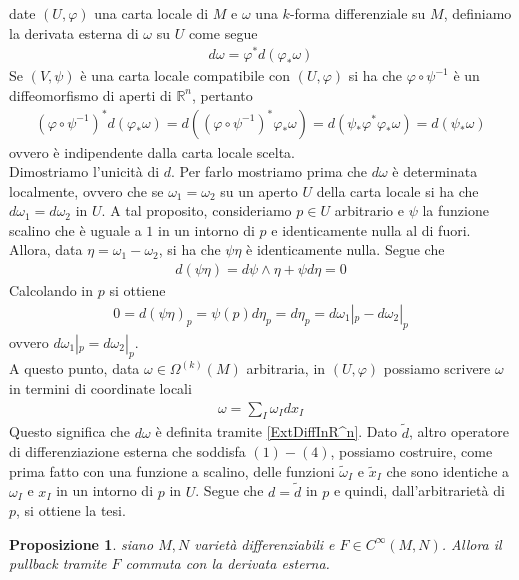 \documentclass[twoside, 11pt]{amsbook}
\makeatletter
\newcommand{\0}{{(0)}}
\newcommand{\3}{{(3)}}
\theoremstyle{colonplain}
\newtheorem{prop}[thm]{Proposizione}
\theoremstyle{colondefinition}
\theoremstyle{colonremark}
\numberwithin{equation}{chapter}
\renewcommand{\proofname}{Dimostrazione}
\renewenvironment{proof}[1][\proofname]{\par
  \pushQED{\qed}%
  \normalfont \topsep6\p@\@plus6\p@\relax
  \trivlist
  \item[\hskip\labelsep\bfseries #1:]\ignorespaces
}{%
  \popQED\endtrivlist\@endpefalse
}
\makeatother
\begin{document}
\begin{proof} date $(U, \varphi)$ una carta locale di $M$ e $\omega$ una $k$-forma differenziale su $M$, definiamo la derivata esterna di $\omega$ su $U$ come segue
\begin{align}
    d\omega = \varphi^*d(\varphi_*\omega)
\end{align}
Se $(V, \psi)$ è una carta locale compatibile con $(U, \varphi)$ si ha che $\varphi \circ \psi^{-1}$ è un diffeomorfismo di aperti di $\mathbb{R}^n$, pertanto
\begin{align}
    (\varphi \circ \psi^{-1})^*d(\varphi_*\omega) = d((\varphi \circ \psi^{-1})^*\varphi_*\omega) = d(\psi_*\varphi^*\varphi_*\omega) = d(\psi_*\omega)
\end{align}
ovvero è indipendente dalla carta locale scelta. \\
Dimostriamo l'unicità di $d$. Per farlo mostriamo prima che $d\omega$ è determinata localmente, ovvero che se $\omega_1 = \omega_2$ su un aperto $U$ della carta locale si ha che $d\omega_1 = d\omega_2$ in $U$. A tal proposito, consideriamo $p \in U$ arbitrario e $\psi$ la funzione scalino che è uguale a $1$ in un intorno di $p$ e identicamente nulla al di fuori. Allora, data $\eta = \omega_1 - \omega_2$, si ha che $\psi\eta$ è identicamente nulla. Segue che
\begin{align}
    d(\psi\eta) = d\psi \wedge \eta + \psi d\eta = 0
\end{align}
Calcolando in $p$ si ottiene
\begin{align}
    0 = d(\psi\eta)_p = \psi(p)d\eta_p = d\eta_p = d\omega_1|_p - d\omega_2|_p
\end{align}
ovvero $d\omega_1|_p = d\omega_2|_p$. \\
A questo punto, data $\omega \in \Omega^{(k)}(M)$ arbitraria, in $(U, \varphi)$ possiamo scrivere $\omega$ in termini di coordinate locali
\begin{align}
    \omega = \sum_I \omega_I dx_I
\end{align}
Questo significa che $d\omega$ è definita tramite \eqref{ExtDiffInR^n}. Dato $\widetilde{d}$, altro operatore di differenziazione esterna che soddisfa $(1)-(4)$, possiamo costruire, come prima fatto con una funzione a scalino, delle funzioni $\widetilde{\omega}_I$ e $\widetilde{x}_I$ che sono identiche a $\omega_I$ e $x_I$ in un intorno di $p$ in $U$. Segue che $d = \widetilde{d}$ in $p$ e quindi, dall'arbitrarietà di $p$, si ottiene la tesi.
\end{proof}
\begin{prop} siano $M, N$ varietà differenziabili e $F \in C^\infty(M, N)$. Allora il pullback tramite $F$ commuta con la derivata esterna.
\end{prop}
\end{document}
